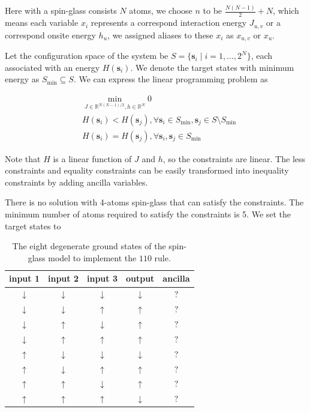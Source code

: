 \documentclass[twocolumn,superscriptaddress,english,showpacs,longbibliography]{revtex4-2}
\begin{document}
Here with a spin-glass consists $N$ atoms, we choose $n$ to be $\frac{N(N-1)}{2} + N$, which means each variable $x_i$ represents a correspond interaction energy $J_{u, v}$ or a correspond onsite energy $h_u$, we assigned aliases to these $x_i$ as $x_{u,v}$ or $x_{u}$.

Let the configuration space of the system be $S = \{\mathbf s_i\mid i=1,\ldots, 2^N\}$, each associated with an energy $H(\mathbf s_i)$. We denote the target states with minimum energy as $S_{\text{min}} \subseteq S$. We can express the linear programming problem as

\begin{equation}
    \begin{split}
        &\min_{J \in \mathbb{R}^{N(N{-}1)/2}, h\in \mathbb{R}^N} 0\\
        &H(\mathbf s_i) < H(\mathbf s_j), \forall \mathbf s_i \in S_{\text{min}}, \mathbf s_j \in S \setminus S_{\text{min}}\\
        &H(\mathbf s_i) = H(\mathbf s_j), \forall \mathbf s_i, \mathbf s_j \in S_{\text{min}}
    \end{split}
\end{equation}

Note that $H$ is a linear function of $J$ and $h$, so the
constraints are linear. The less constraints and equality constraints
can be easily transformed into inequality constraints by adding ancilla
variables.

There is no solution with 4-atoms spin-glass that can satisfy the
constraints. The minimum number of atoms required to satisfy the
constraints is 5. We set the target states to

\begin{table}[H]
    \centering
\begin{tabular}{|c|c|c|c|c|}
\hline
input 1 & input 2 & input 3 & output & ancilla \\
\hline
$\downarrow$ & $\downarrow$ & $\downarrow$ & $\downarrow$ & $?$ \\
$\downarrow$ & $\downarrow$ & $\uparrow$ & $\uparrow$ & $?$ \\
$\downarrow$ & $\uparrow$ & $\downarrow$ & $\uparrow$ & $?$ \\
$\downarrow$ & $\uparrow$ & $\uparrow$ & $\uparrow$ & $?$ \\
$\uparrow$ & $\downarrow$ & $\downarrow$ & $\downarrow$ & $?$ \\
$\uparrow$ & $\downarrow$ & $\uparrow$ & $\uparrow$ & $?$ \\
$\uparrow$ & $\uparrow$ & $\downarrow$ & $\uparrow$ & $?$ \\
$\uparrow$ & $\uparrow$ & $\uparrow$ & $\downarrow$ & $?$ \\
\hline
\end{tabular}
\caption{The eight degenerate ground states of the spin-glass model to implement the $110$ rule.}
\end{table}
\end{document}
